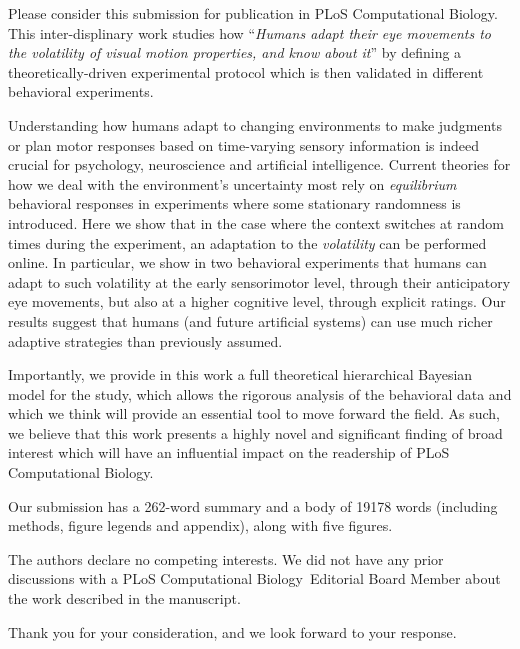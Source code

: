 \documentclass[stdletter,8pt,dateno]{newlfm}%
\newcommand{\Title}{Humans adapt their eye movements to the volatility of visual motion properties, and know about it}
\newcommand{\Journal}{PLoS Computational Biology}%
\begin{document}
\begin{newlfm}
%
Please consider this submission for publication in \Journal . This inter-displinary work studies how ``\emph{\Title}'' by defining a theoretically-driven experimental protocol which is then validated in different behavioral experiments.

Understanding how humans adapt to changing environments to make judgments or plan motor responses based on time-varying sensory information 
is indeed crucial for psychology, neuroscience
and artificial intelligence.  
Current theories for how we deal with the environment's uncertainty most rely on \emph{equilibrium} behavioral responses in experiments where some stationary randomness is introduced.  
Here we show that in the case where the context switches at random times during the experiment, an adaptation to the \emph{volatility} can be performed online.
In particular, we show in two behavioral experiments that humans can adapt to such volatility at the early sensorimotor level, through their anticipatory eye movements, but also at a higher cognitive level, through explicit ratings. 
Our results suggest that humans (and future artificial
systems) can use much richer adaptive strategies than previously
assumed.

Importantly, we provide in this work a full theoretical hierarchical Bayesian model for the study, which allows the rigorous analysis of the behavioral data and which we think will provide an essential tool to move forward the field. 
As such, we believe that this work presents a highly novel and significant finding of broad interest 
which will have an influential impact on the readership of \Journal .

Our submission has a 262-word summary and a body of 19178 words
(including methods, figure legends and appendix), along with five figures.

The authors declare no competing interests.
We did not have any prior discussions with
a \Journal\ Editorial Board Member
about the work described in the manuscript.

Thank you for your consideration, and we look forward to your response.

\end{newlfm}
\end{document}
